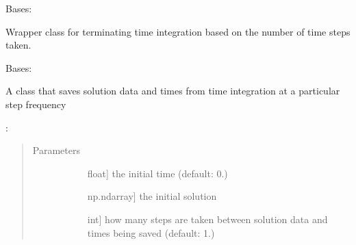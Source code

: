 \documentclass[letterpaper,10pt,english]{sphinxmanual}
\begin{document}
\begin{fulllineitems}
\label{\detokenize{spitfire.time.governor:spitfire.time.governor.NumberOfTimeSteps}}
Bases: 

Wrapper class for terminating time integration based on the number of time steps taken.

\end{fulllineitems}


\begin{fulllineitems}
\label{\detokenize{spitfire.time.governor:spitfire.time.governor.SaveAllDataToList}}
Bases: 

A class that saves solution data and times from time integration at a particular step frequency

:
\begin{quote}\begin{description}
\item[{Parameters}] \leavevmode\begin{description}
\item[{}] \leavevmode{[}float{]}
the initial time (default: 0.)

\item[{}] \leavevmode{[}np.ndarray{]}
the initial solution

\item[{}] \leavevmode{[}int{]}
how many steps are taken between solution data and times being saved (default: 1.)

\end{description}

\end{description}\end{quote}


\end{fulllineitems}
\end{document}
